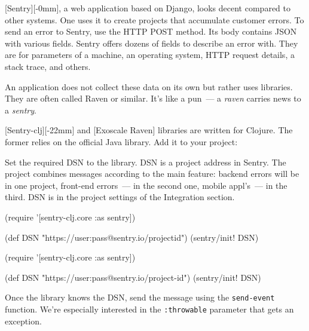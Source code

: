
[Sentry][-0mm], a web application based on Django, looks decent compared to other systems. One uses it to create projects that accumulate customer errors. To send an error to Sentry, use the HTTP POST method. Its body contains JSON with various fields. Sentry offers dozens of fields to describe an error with. They are for parameters of a machine, an operating system, HTTP request details, a stack trace, and others.


An application does not collect these data on its own but rather uses libraries. They are often called Raven or similar. It's like a pun~--- a \emph{raven} carries news to a \emph{sentry}.

[Sentry-clj][-22mm] and [Exoscale Raven] libraries are written for Clojure. The former relies on the official Java library. Add it to your project:

\begin{clojure}
\end{clojure}


Set the required DSN to the library. DSN is a project address in Sentry. The project combines messages according to the main feature: backend errors will be in one project, front-end errors~--- in the second one, mobile appl's~--- in the third. DSN is in the project settings of the Integration section.

\ifx\DEVICETYPE\MOBILE

\begin{clojure}
(require '[sentry-clj.core :as sentry])

(def DSN
 "https://user:pass@sentry.io/projectid")
(sentry/init! DSN)
\end{clojure}

\else

\begin{clojure}
(require '[sentry-clj.core :as sentry])

(def DSN "https://user:pass@sentry.io/project-id")
(sentry/init! DSN)
\end{clojure}

\fi

Once the library knows the DSN, send the message using the \verb|send-event| function. We're especially interested in the \verb|:throwable| parameter that gets an exception.


